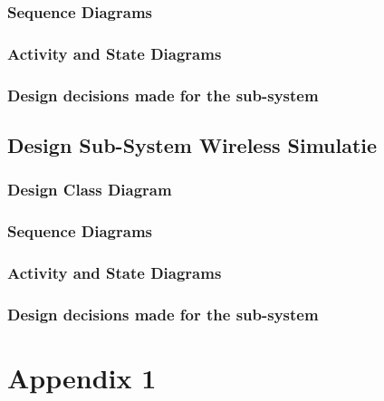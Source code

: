 \documentclass[a4paper, 11pt, oneside]{report}
\begin{document}
\subsection{Sequence Diagrams}
\label{DetailedDesign:MeshNetwerk:sequence}
\subsection{Activity and State Diagrams}
\label{DetailedDesign:MeshNetwerk:activity}
\subsection{Design decisions made for the sub-system}
\label{DetailedDesign:MeshNetwerk:decisions}

\section{Design Sub-System Wireless Simulatie}
\label{DetailedDesign:WirelessSimulatie}
\subsection{Design Class Diagram}
\label{DetailedDesign:WirelessSimulatie:class}
\subsection{Sequence Diagrams}
\label{DetailedDesign:WirelessSimulatie:sequence}
\subsection{Activity and State Diagrams}
\label{DetailedDesign:WirelessSimulatie:activity}
\subsection{Design decisions made for the sub-system}
\label{DetailedDesign:WirelessSimulatie:decisions}





\clearpage
\appendix
\chapter{Appendix 1}
\label{app:iteratieplan}
\end{document}
